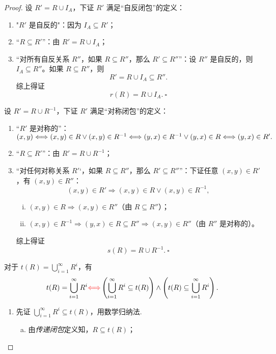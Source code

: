 \documentclass[normal,cyan]{elegantnote}
\newcommand{\QED}{\square}
\begin{document}
\begin{proof}
    设 $R' = R \cup I_A$，下证 $R'$ 满足“自反闭包”的定义：
    \begin{enumerate}
        \item "$R'$ 是自反的"：因为 $I_A \subseteq R'$；
        \item “$R \subseteq R'$”：由 $R' = R \cup I_A$；
        \item “对所有自反关系 $R''$，如果 $R \subseteq R''$，那么 $R' \subseteq R''$”：设 $R''$ 是自反的，则 $I_A \subseteq R''$。如果 $R \subseteq R''$，则 $$R' = R \cup I_A \subseteq R''.$$ 综上得证 $$r(R) = R \cup I_A.\ \QED$$
    \end{enumerate}
    设 $R' = R \cup R^{-1}$，下证 $R'$ 满足“对称闭包”的定义：
    \begin{enumerate}
        \item “$R'$ 是对称的”：$(x, y) \Longleftrightarrow (x, y) \in R \vee (x, y) \in R^{-1} \\
        \Longleftrightarrow (y, x) \in R^{-1} \vee (y, x) \in R \\
        \Longleftrightarrow (y, x) \in R'.$
        \item “$R \subseteq R'$”：由 $R' = R \cup R^{-1}$；
        \item “对任何对称关系 $R'‘$，如果 $R \subseteq R''$，那么 $R' \subseteq R''$”：下证任意 $(x, y) \in R'$，有 $(x, y) \in R''$：$$(x, y) \in R' \Longrightarrow (x, y) \in R \vee (x, y) \in R^{-1},$$
        \begin{enumerate}[(i)]
            \item $(x, y) \in R \Longrightarrow (x, y) \in R''$（由 $R \subseteq R''$）；
            \item $(x, y) \in R^{-1} \Longrightarrow (y, x) \in R \subseteq R'' \Longrightarrow (x, y) \in R''$（由 $R''$ 是对称的）。
        \end{enumerate}
        综上得证 $$s(R) = R \cup R^{-1}.\ \QED$$
    \end{enumerate}
    对于 $t(R) = \bigcup\limits_{i = 1}^{\infty}R^i$，有 $$t(R) = \bigcup\limits_{i = 1}^{\infty}R^i {\color{red}\Longleftrightarrow} \left(\bigcup\limits_{i = 1}^{\infty}R^i \subseteq t(R)\right) \wedge \left(t(R) \subseteq \bigcup\limits_{i = 1}^{\infty}R^i\right).$$
    \begin{enumerate}
        \item 先证 $\bigcup\limits_{i = 1}^{\infty}R^i \subseteq t(R)$，用数学归纳法.
        \begin{enumerate}[a)]
            \item 由\emph{传递闭包}定义知，$R \subseteq t(R)$；

\end{enumerate}
\end{enumerate}
\end{proof}
\end{document}

